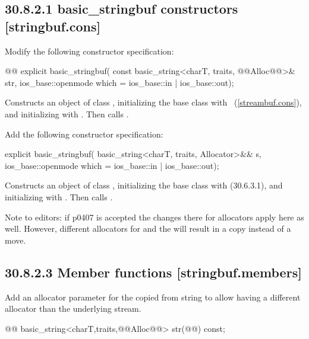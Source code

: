 \documentclass[ebook,11pt,article]{memoir}
\begin{document}
\subsection{30.8.2.1 basic\_stringbuf constructors [stringbuf.cons]}
Modify the following constructor specification:
\begin{itemdecl}
@@
explicit basic_stringbuf(
  const basic_string<charT, traits, @@Alloc@@>& str,
  ios_base::openmode which = ios_base::in | ios_base::out);
\end{itemdecl}

\begin{itemdescr}
\pnum
\effects
Constructs an object of class
,
initializing the base class with
~(\ref{streambuf.cons}), and initializing
with .
Then calls .
\end{itemdescr}

Add the following constructor specification:
\begin{insrt}
\begin{itemdecl}
      explicit basic_stringbuf(
        basic_string<charT, traits, Allocator>&& s,
        ios_base::openmode which = ios_base::in | ios_base::out);
\end{itemdecl}
\begin{itemdescr}
\pnum
\effects Constructs an object of class , initializing the base class with  (30.6.3.1), and initializing  with . Then calls .
\end{itemdescr}
\end{insrt}

Note to editors: if p0407 is accepted the changes there for allocators apply here as well. However, different allocators for  and the  will result in a copy instead of a move.

\subsection{30.8.2.3 Member functions [stringbuf.members]}
Add an allocator parameter for the copied from string to allow having a different allocator than the underlying stream.
\begin{codeblock}
@@
basic_string<charT,traits,@@Alloc@@> str(@@) const;
\end{codeblock}
\end{document}
